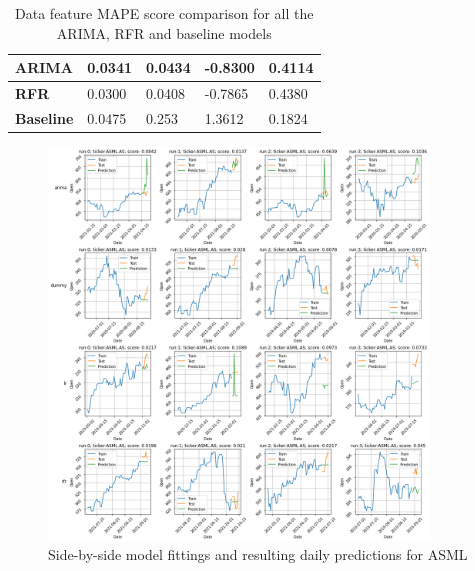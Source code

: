 \begin{table}[h]
{\begin{tabular}{l|llll|}
\multicolumn{1}{|l|}{\textbf{ARIMA}}    & 0.0341                                     & 0.0434                                    & -0.8300                              & 0.4114     \\ \hline
\multicolumn{1}{|l|}{\textbf{RFR}}      & 0.0300                                     & 0.0408                                    & -0.7865                              & 0.4380     \\ \hline
\multicolumn{1}{|l|}{\textbf{Baseline}} & 0.0475                                     & 0.253                                     & 1.3612                               & 0.1824     \\ \hline
\end{tabular}
\caption{Data feature MAPE score comparison for all the ARIMA, RFR and baseline models}
\label{tbl:datascores}
}
\hspace*{\fill}
\end{table}

\begin{figure}[H]
  \includegraphics[width=0.9\textwidth]{images/plots/sample_fits_asml.png}
  \caption{Side-by-side model fittings and resulting daily predictions for ASML}
  \label{fig:samplefits}
\end{figure}

